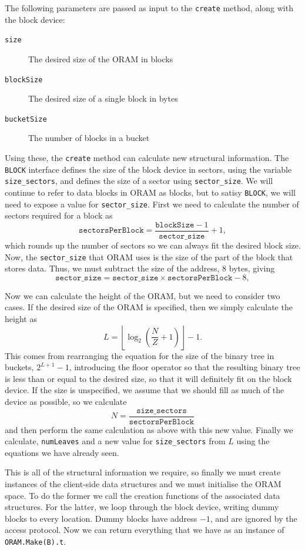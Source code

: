 \documentclass[12pt,a4paper,twoside,openright]{report}
\begin{document}
The following parameters are passed as input to the \texttt{create} method, along with the block device:

\begin{description}
  \item[\texttt{size}] The desired size of the ORAM in blocks
  \item[\texttt{blockSize}] The desired size of a single block in bytes
  \item[\texttt{bucketSize}] The number of blocks in a bucket
\end{description}

Using these, the \texttt{create} method can calculate new structural information. The \texttt{BLOCK} interface defines the size of the block device in sectors, using the variable \texttt{size\_sectors}, and defines the size of a sector using \texttt{sector\_size}. We will continue to refer to data blocks in ORAM as blocks, but to satisy \texttt{BLOCK}, we will need to expose a value for \texttt{sector\_size}. First we need to calculate the number of sectors required for a block as $$\mathtt{sectorsPerBlock} = \frac{\mathtt{blockSize} - 1}{\mathtt{sector\_size}} + 1,$$ which rounds up the number of sectors so we can always fit the desired block size. Now, the \texttt{sector\_size} that ORAM uses is the size of the part of the block that stores data. Thus, we must subtract the size of the address, 8 bytes, giving $$\mathtt{sector\_size} = \mathtt{sector\_size} \times \mathtt{sectorsPerBlock} - 8,$$

Now we can calculate the height of the ORAM, but we need to consider two cases. If the desired size of the ORAM is specified, then we simply calculate the height as $$L = \left\lfloor \log_2\left(\frac{N}{Z} + 1\right)\right\rfloor - 1.$$ This comes from rearranging the equation for the size of the binary tree in buckets, $2^{L + 1} - 1$, introducing the floor operator so that the resulting binary tree is less than or equal to the desired size, so that it will definitely fit on the block device. If the size is unspecified, we assume that we should fill as much of the device as possible, so we calculate $$N = \frac{\mathtt{size\_sectors}}{\mathtt{sectorsPerBlock}}$$ and then perform the same calculation as above with this new value. Finally we calculate, \texttt{numLeaves} and a new value for \texttt{size\_sectors} from $L$ using the equations we have already seen.

This is all of the structural information we require, so finally we must create instances of the client-side data structures and we must initialise the ORAM space. To do the former we call the creation functions of the associated data structures. For the latter, we loop through the block device, writing dummy blocks to every location. Dummy blocks have address $-1$, and are ignored by the access protocol. Now we can return everything that we have as an instance of \texttt{ORAM.Make(B).t}.
\end{document}
